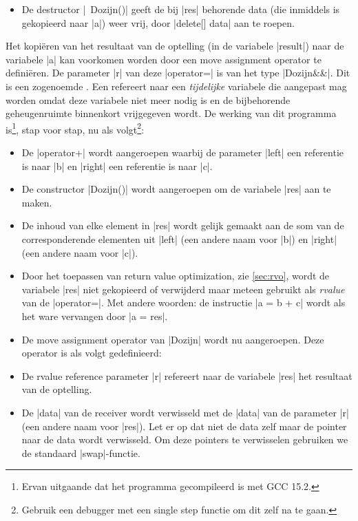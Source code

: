 \begin{cpplstShortInline}
\begin{itemize}
	\item 
	De destructor |~Dozijn()| geeft de bij |res| behorende data (die inmiddels is gekopieerd naar |a|) weer vrij, door |delete[] data| aan te roepen.
\end{itemize}
Het kopiëren van het resultaat van de optelling (in de variabele |result|) naar de variabele |a| kan voorkomen worden door een move assignment operator te definiëren.
De parameter |r| van deze |operator=| is van het type |Dozijn&&|.
Dit is een zogenoemde .
Een  refereert naar een \emph{tijdelijke} variabele die aangepast mag worden omdat deze variabele niet meer nodig is en de bijbehorende geheugenruimte binnenkort vrijgegeven wordt.
De werking van dit programma is\footnote{%
	Ervan uitgaande dat het programma gecompileerd is met GCC 15.2.
}, stap voor stap, nu als volgt\footnote{%
	Gebruik een debugger met een single step functie om dit zelf na te gaan.
}: 
\begin{itemize}
	\item 
	De |operator+| wordt aangeroepen waarbij de parameter |left| een referentie is naar |b| en |right| een referentie is naar |c|.
	\item 
	De constructor |Dozijn()| wordt aangeroepen om de variabele |res| aan te maken.
	\item 
	De inhoud van elke element in |res| wordt gelijk gemaakt aan de som van de corresponderende elementen uit |left| (een andere naam voor |b|) en |right| (een andere naam voor |c|).
	\item
	Door het toepassen van return value optimization, zie \cref{sec:rvo}, wordt de variabele |res| niet gekopieerd of verwijderd maar meteen gebruikt als \emph{rvalue} van de |operator=|.
	Met andere woorden: de instructie |a = b + c| wordt als het ware vervangen door |a = res|.
	\item 
	De move assignment operator van |Dozijn| wordt nu aangeroepen.
	Deze operator is als volgt gedefinieerd:
	\item  
	De rvalue reference parameter |r| refereert naar de variabele |res| het resultaat van de optelling.
	\item 
	De |data| van de receiver wordt verwisseld met de |data| van de parameter |r| (een andere naam voor |res|).
	Let er op dat niet de data zelf maar de pointer naar de data wordt verwisseld.
	Om deze pointers te verwisselen gebruiken we de standaard |swap|-functie.

\end{itemize}
\end{cpplstShortInline}
